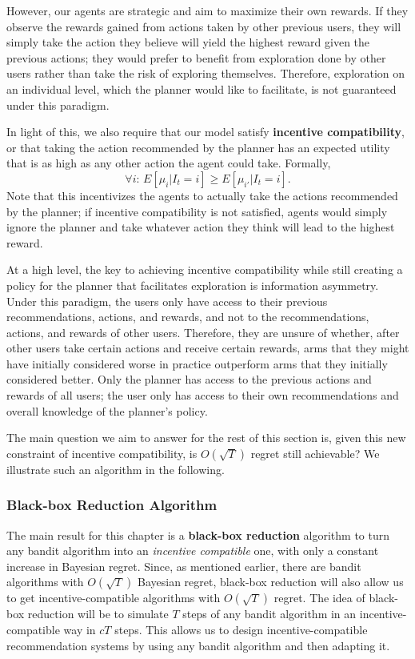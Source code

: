 \documentclass[
  letterpaper,
  numbers=noenddot,
  DIV=11]{scrreprt}
\theoremstyle{plain}
\theoremstyle{definition}
\theoremstyle{plain}
\theoremstyle{remark}
\begin{document}
However, our agents are strategic and aim to maximize their own rewards.
If they observe the rewards gained from actions taken by other previous
users, they will simply take the action they believe will yield the
highest reward given the previous actions; they would prefer to benefit
from exploration done by other users rather than take the risk of
exploring themselves. Therefore, exploration on an individual level,
which the planner would like to facilitate, is not guaranteed under this
paradigm.

In light of this, we also require that our model satisfy
\textbf{incentive compatibility}, or that taking the action recommended
by the planner has an expected utility that is as high as any other
action the agent could take. Formally,
\[\forall i : \, E[\mu_i | I_t = i] \geq E[\mu_{i'} | I_t = i].\] Note
that this incentivizes the agents to actually take the actions
recommended by the planner; if incentive compatibility is not satisfied,
agents would simply ignore the planner and take whatever action they
think will lead to the highest reward.

At a high level, the key to achieving incentive compatibility while
still creating a policy for the planner that facilitates exploration is
information asymmetry. Under this paradigm, the users only have access
to their previous recommendations, actions, and rewards, and not to the
recommendations, actions, and rewards of other users. Therefore, they
are unsure of whether, after other users take certain actions and
receive certain rewards, arms that they might have initially considered
worse in practice outperform arms that they initially considered better.
Only the planner has access to the previous actions and rewards of all
users; the user only has access to their own recommendations and overall
knowledge of the planner's policy.

The main question we aim to answer for the rest of this section is,
given this new constraint of incentive compatibility, is \(O(\sqrt{T})\)
regret still achievable? We illustrate such an algorithm in the
following.

\subsubsection*{Black-box Reduction
Algorithm}\label{black-box-reduction-algorithm}

The main result for this chapter is a \textbf{black-box reduction}
algorithm to turn any bandit algorithm into an \emph{incentive
compatible} one, with only a constant increase in Bayesian regret.
Since, as mentioned earlier, there are bandit algorithms with
\(O(\sqrt{T})\) Bayesian regret, black-box reduction will also allow us
to get incentive-compatible algorithms with \(O(\sqrt{T})\) regret. The
idea of black-box reduction will be to simulate \(T\) steps of any
bandit algorithm in an incentive-compatible way in \(c T\) steps. This
allows us to design incentive-compatible recommendation systems by using
any bandit algorithm and then adapting it.
\end{document}

